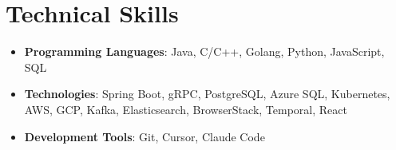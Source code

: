 \documentclass[letterpaper,10pt]{article}
\newcommand{\resumeItem}[1]{\item\small{#1}}
\newcommand{\resumeSubHeadingList}{\begin{itemize}[leftmargin=0.15in, label={}]}
\newcommand{\resumeSubHeadingListEnd}{\end{itemize}}
\begin{document}
\section{Technical Skills}
\resumeSubHeadingList
  \resumeItem{\textbf{Programming Languages}: Java, C/C++, Golang, Python, JavaScript, SQL}
  \resumeItem{\textbf{Technologies}: Spring Boot, gRPC, PostgreSQL, Azure SQL, Kubernetes, AWS, GCP, Kafka, Elasticsearch, BrowserStack, Temporal, React}
  \resumeItem{\textbf{Development Tools}: Git, Cursor, Claude Code}
\resumeSubHeadingListEnd
\end{document}

